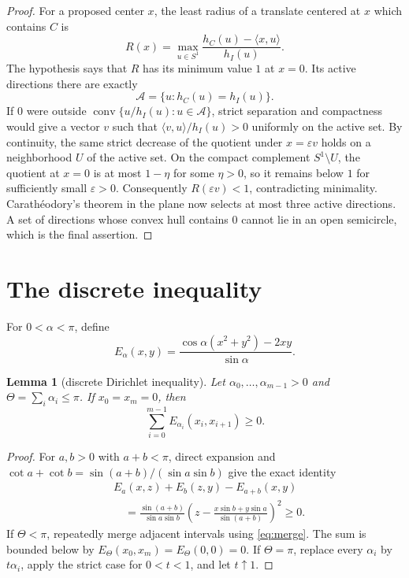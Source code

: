 \documentclass[11pt]{article}
\newtheorem{lemma}{Lemma}
\newcommand{\conv}{\operatorname{conv}}
\begin{document}
\begin{proof}
For a proposed center $x$, the least radius of a translate centered at $x$
which contains $C$ is
\[
 R(x)=\max_{u\in S^1}
 \frac{h_C(u)-\langle x,u\rangle}{h_I(u)}.
\]
The hypothesis says that $R$ has its minimum value $1$ at $x=0$.  Its active
directions there are exactly
\[
 \mathcal A=\{u:h_C(u)=h_I(u)\}.
\]
If $0$ were outside
$\conv\{u/h_I(u):u\in\mathcal A\}$, strict separation and compactness would
give a vector $v$ such that $\langle v,u\rangle/h_I(u)>0$ uniformly on the
active set.  By continuity, the same strict decrease of the quotient under
$x=\varepsilon v$ holds on a neighborhood $U$ of the active set.  On the
compact complement $S^1\setminus U$, the quotient at $x=0$ is at most
$1-\eta$ for some $\eta>0$, so it remains below $1$ for sufficiently small
$\varepsilon>0$.  Consequently $R(\varepsilon v)<1$, contradicting
minimality.  Carath\'eodory's theorem in the plane now selects at most three
active directions.  A set of directions whose convex hull contains $0$
cannot lie in an open semicircle, which is the final assertion.
\end{proof}

\section{The discrete inequality}

For $0<\alpha<\pi$, define
\begin{equation}\label{eq:ealpha}
 E_\alpha(x,y)=
 \frac{\cos\alpha(x^2+y^2)-2xy}{\sin\alpha}.
\end{equation}

\begin{lemma}[discrete Dirichlet inequality]\label{lem:energy}
Let $\alpha_0,\ldots,\alpha_{m-1}>0$ and
$\Theta=\sum_i\alpha_i\leq\pi$.  If $x_0=x_m=0$, then
\[
 \sum_{i=0}^{m-1}E_{\alpha_i}(x_i,x_{i+1})\geq0.
\]
\end{lemma}

\begin{proof}
For $a,b>0$ with $a+b<\pi$, direct expansion and
$\cot a+\cot b=\sin(a+b)/(\sin a\sin b)$ give the exact identity
\begin{align}\label{eq:merge}
 &E_a(x,z)+E_b(z,y)-E_{a+b}(x,y)\\
 &\quad=
 \frac{\sin(a+b)}{\sin a\sin b}
 \left(z-\frac{x\sin b+y\sin a}{\sin(a+b)}\right)^2\geq0.\nonumber
\end{align}
If $\Theta<\pi$, repeatedly merge adjacent intervals using
\eqref{eq:merge}.  The sum is bounded below by
$E_\Theta(x_0,x_m)=E_\Theta(0,0)=0$.  If $\Theta=\pi$, replace every
$\alpha_i$ by $t\alpha_i$, apply the strict case for $0<t<1$, and let
$t\uparrow1$.
\end{proof}
\end{document}
